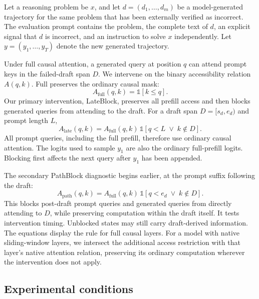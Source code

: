\documentclass{article}
\newcommand{\fullaccess}{\ifmmode\mathrm{Full}\else\textup{Full}\fi}
\newcommand{\lateblock}{\ifmmode\mathrm{LateBlock}\else\textup{LateBlock}\fi}
\newcommand{\pathblock}{\ifmmode\mathrm{PathBlock}\else\textup{PathBlock}\fi}
\begin{document}
Let a reasoning problem be $x$, and let $d=(d_1,\ldots,d_m)$ be a model-generated trajectory for the same problem that has been externally verified as incorrect. The evaluation prompt contains the problem, the complete text of $d$, an explicit signal that $d$ is incorrect, and an instruction to solve $x$ independently. Let $y=(y_1,\ldots,y_T)$ denote the new generated trajectory.

Under full causal attention, a generated query at position $q$ can attend prompt keys in the failed-draft span $D$. We intervene on the binary accessibility relation $A(q,k)$. \fullaccess{} preserves the ordinary causal mask:
\begin{equation}
    A_{\mathrm{full}}(q,k)=\mathbb{1}[k\leq q].
\end{equation}
Our primary intervention, \lateblock{}, preserves all prefill access and then blocks generated queries from attending to the draft. For a draft span $D=[s_d,e_d)$ and prompt length $L$,
\begin{equation}
    A_{\mathrm{late}}(q,k)
    = A_{\mathrm{full}}(q,k)\,\mathbb{1}[q<L \;\lor\; k\notin D].
    \label{eq:late}
\end{equation}
All prompt queries, including the full prefill, therefore use ordinary causal attention. The logits used to sample $y_1$ are also the ordinary full-prefill logits. Blocking first affects the next query after $y_1$ has been appended.

The secondary \pathblock{} diagnostic begins earlier, at the prompt suffix following the draft:
\begin{equation}
    A_{\mathrm{path}}(q,k)
    = A_{\mathrm{full}}(q,k)\,\mathbb{1}[q<e_d \;\lor\; k\notin D].
    \label{eq:path}
\end{equation}
This blocks post-draft prompt queries and generated queries from directly attending to $D$, while preserving computation within the draft itself. It tests intervention timing. Unblocked states may still carry draft-derived information. The equations display the rule for full causal layers. For a model with native sliding-window layers, we intersect the additional access restriction with that layer's native attention relation, preserving its ordinary computation wherever the intervention does not apply.

\subsection{Experimental conditions}
\end{document}
